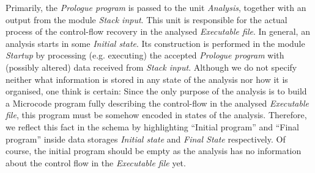 \documentclass[10pt,twocolumn]{article}
\begin{document}
Primarily, the \emph{Prologue program} is passed to %
the unit \emph{Analysis}, together with an output from the module \emph{Stack
input}. This unit is responsible for the actual process of the control-flow
recovery in the analysed \emph{Executable file}. In general, an analysis starts
in some \emph{Initial state}. Its construction is performed in the module
\emph{Startup} by processing (e.g. executing) the accepted \emph{Prologue
program} with (possibly altered) data received from \emph{Stack input}. Although
we do not specify neither what information is stored in any state of the
analysis nor how it is organised, one think is certain: Since the only purpose
of the analysis is to build a Microcode program fully describing the
control-flow in the analysed \emph{Executable file}, this program must be
somehow encoded in states of the analysis. Therefore, we reflect this fact in
the schema by highlighting ``Initial program'' and ``Final program'' inside data
storages \emph{Initial state} and \emph{Final State} respectively. Of course,
the initial program should be empty as the analysis has no information about the
control flow in the \emph{Executable file} yet.
\end{document}
